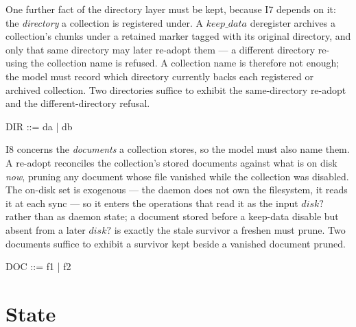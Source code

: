 \documentclass[a4paper]{article}
\begin{document}
One further fact of the directory layer must be kept, because I7 depends on it:
the \textit{directory} a collection is registered under.  A $keep\_data$
deregister archives a collection's chunks under a retained marker tagged with
its original directory, and only that same directory may later re-adopt them ---
a different directory re-using the collection name is refused.  A collection name
is therefore not enough; the model must record which directory currently backs
each registered or archived collection.  Two directories suffice to exhibit the
same-directory re-adopt and the different-directory refusal.

\begin{zed}
  DIR ::= da | db
\end{zed}

I8 concerns the \textit{documents} a collection stores, so the model must also
name them.  A re-adopt reconciles the collection's stored documents against what
is on disk \textit{now}, pruning any document whose file vanished while the
collection was disabled.  The on-disk set is exogenous --- the daemon does not
own the filesystem, it reads it at each sync --- so it enters the operations that
read it as the input $disk?$ rather than as daemon state; a document stored
before a keep-data disable but absent from a later $disk?$ is exactly the stale
survivor a freshen must prune.  Two documents suffice to exhibit a survivor kept
beside a vanished document pruned.

\begin{zed}
  DOC ::= f1 | f2
\end{zed}

\section{State}
\end{document}
